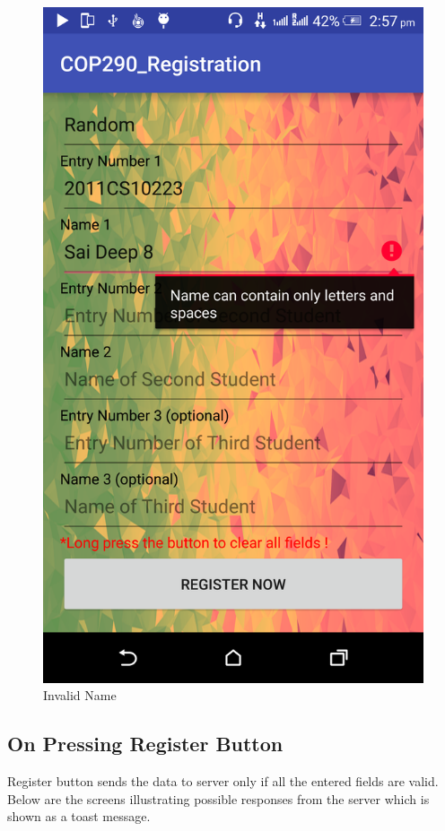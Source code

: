 \documentclass[12pt]{article}
\begin{document}
\begin{figure}[!htb]
\begin{minipage}[b]{0.4\textwidth}
    \includegraphics[width=\textwidth]{images/invalidname.png}
    \caption{Invalid Name}
  \end{minipage}
\end{figure}

\FloatBarrier
\subsection{On Pressing Register Button}
Register button sends the data to server only if all the entered fields are valid. Below are the screens illustrating possible responses from the server which is shown as a toast message.
\end{document}

